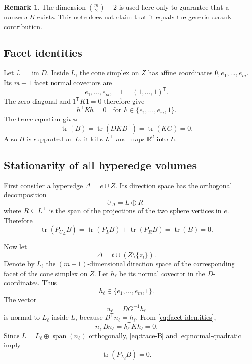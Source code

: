 \documentclass[11pt]{article}
\theoremstyle{definition}
\newtheorem{remark}[theorem]{Remark}
\newcommand{\R}{\mathbb{R}}
\newcommand{\tr}{\operatorname{tr}}
\newcommand{\im}{\operatorname{im}}
\newcommand{\spanop}{\operatorname{span}}
\begin{document}
\begin{remark}
The dimension \(\binom m2-2\) is used here only to guarantee that a
nonzero \(K\) exists.  This note does not claim that it equals the
generic corank contribution.
\end{remark}

\subsection{Facet identities}

Let \(L=\im D\).  Inside \(L\), the cone simplex on \(Z\) has affine
coordinates \(0,e_1,\ldots,e_m\).  Its \(m+1\) facet normal covectors
are
\[
  e_1,\ldots,e_m,\quad 1=(1,\ldots,1)^{\mathsf T}.
\]
The zero diagonal and \(1^{\mathsf T}K1=0\) therefore give
\begin{equation}
  h^{\mathsf T}Kh=0
  \quad\text{for }h\in\{e_1,\ldots,e_m,1\}.
  \label{eq:facet-identities}
\end{equation}
The trace equation gives
\begin{equation}
  \tr(B)=\tr(DKD^{\mathsf T})=\tr(KG)=0.
  \label{eq:trace-B}
\end{equation}
Also \(B\) is supported on \(L\): it kills \(L^\perp\) and maps
\(\R^d\) into \(L\).

\subsection{Stationarity of all hyperedge volumes}

First consider a hyperedge \(\Delta=e\cup Z\).  Its direction space
has the orthogonal decomposition
\[
  U_\Delta=L\oplus R,
\]
where \(R\subseteq L^\perp\) is the span of the projections of the two
sphere vertices in \(e\).  Therefore
\begin{equation}
  \tr(P_{U_\Delta}B)=\tr(P_LB)+\tr(P_RB)=\tr(B)=0.
  \label{eq:edge-trace}
\end{equation}

Now let
\[
  \Delta=t\cup(Z\setminus\{z_\ell\}).
\]
Denote by \(L_\ell\) the \((m-1)\)-dimensional direction space of the
corresponding facet of the cone simplex on \(Z\).  Let \(h_\ell\) be
its normal covector in the \(D\)-coordinates.  Thus
\[
  h_\ell\in\{e_1,\ldots,e_m,1\}.
\]
The vector
\[
  n_\ell=DG^{-1}h_\ell
\]
is normal to \(L_\ell\) inside \(L\), because
\(D^{\mathsf T}n_\ell=h_\ell\).  From
\eqref{eq:facet-identities},
\begin{equation}
  n_\ell^{\mathsf T}Bn_\ell
  =h_\ell^{\mathsf T}Kh_\ell=0.
  \label{eq:normal-quadratic}
\end{equation}
Since \(L=L_\ell\oplus\spanop(n_\ell)\) orthogonally,
\eqref{eq:trace-B} and \eqref{eq:normal-quadratic} imply
\[
  \tr(P_{L_\ell}B)=0.
\]
\end{document}
